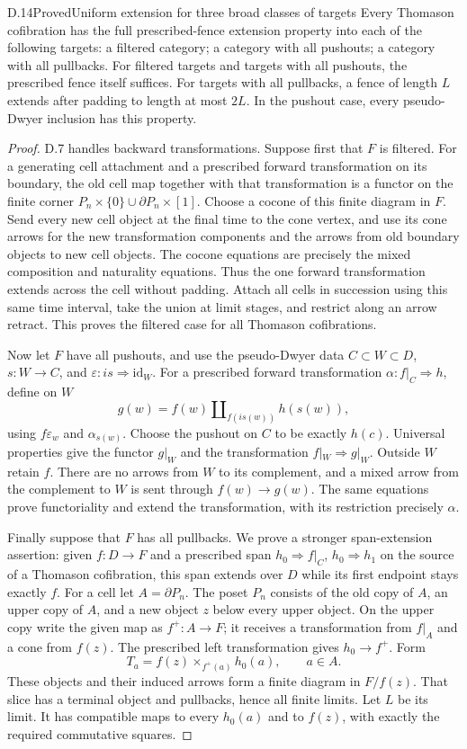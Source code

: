 \begin{claim}{D.14}{Proved}{Uniform extension for three broad classes of targets}
Every Thomason cofibration has the full prescribed-fence extension property into each of the following targets: a filtered category; a category with all pushouts; a category with all pullbacks. For filtered targets and targets with all pushouts, the prescribed fence itself suffices. For targets with all pullbacks, a fence of length $L$ extends after padding to length at most $2L$. In the pushout case, every pseudo-Dwyer inclusion has this property.
\end{claim}
\begin{proof}
D.7 handles backward transformations. Suppose first that $F$ is filtered. For a generating cell attachment and a prescribed forward transformation on its boundary, the old cell map together with that transformation is a functor on the finite corner
$P_n\times\{0\}\cup\partial P_n\times[1]$.
Choose a cocone of this finite diagram in $F$. Send every new cell object at the final time to the cone vertex, and use its cone arrows for the new transformation components and the arrows from old boundary objects to new cell objects. The cocone equations are precisely the mixed composition and naturality equations. Thus the one forward transformation extends across the cell without padding. Attach all cells in succession using this same time interval, take the union at limit stages, and restrict along an arrow retract. This proves the filtered case for all Thomason cofibrations.

Now let $F$ have all pushouts, and use the pseudo-Dwyer data $C\subset W\subset D$, $s:W\to C$, and $\varepsilon:is\Rightarrow\mathrm{id}_W$. For a prescribed forward transformation $\alpha:f|_C\Rightarrow h$, define on $W$
\[
 g(w)=f(w)\amalg_{f(is(w))}h(s(w)),
\]
using $f\varepsilon_w$ and $\alpha_{s(w)}$. Choose the pushout on $C$ to be exactly $h(c)$. Universal properties give the functor $g|_W$ and the transformation $f|_W\Rightarrow g|_W$. Outside $W$ retain $f$. There are no arrows from $W$ to its complement, and a mixed arrow from the complement to $W$ is sent through $f(w)\to g(w)$. The same equations prove functoriality and extend the transformation, with its restriction precisely $\alpha$.

Finally suppose that $F$ has all pullbacks. We prove a stronger span-extension assertion: given $f:D\to F$ and a prescribed span $h_0\Rightarrow f|_C$, $h_0\Rightarrow h_1$ on the source of a Thomason cofibration, this span extends over $D$ while its first endpoint stays exactly $f$. For a cell let $A=\partial P_n$. The poset $P_n$ consists of the old copy of $A$, an upper copy of $A$, and a new object $z$ below every upper object. On the upper copy write the given map as $f^+:A\to F$; it receives a transformation from $f|_A$ and a cone from $f(z)$. The prescribed left transformation gives $h_0\to f^+$. Form
\[
 T_a=f(z)\times_{f^+(a)}h_0(a),\qquad a\in A.
\]
These objects and their induced arrows form a finite diagram in $F/f(z)$. That slice has a terminal object and pullbacks, hence all finite limits. Let $L$ be its limit. It has compatible maps to every $h_0(a)$ and to $f(z)$, with exactly the required commutative squares.


\end{proof}
